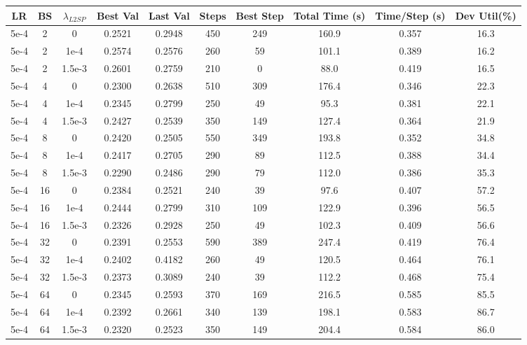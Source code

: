 \begin{table}[p]
\centering
\scriptsize
\renewcommand{\arraystretch}{0.9}

\begin{adjustbox}{max width=\textwidth,max totalheight=\textheight}
\begin{tabular}{cccccccccc}
\hline
LR & BS & $\lambda_{L2SP}$ & Best Val & Last Val & Steps & Best Step & Total Time (s) & Time/Step (s) & Dev Util(\%)\\
\hline
5e-4 &2&0      &0.2521&0.2948&450&249&160.9&0.357&16.3\\
5e-4 &2&1e-4   &0.2574&0.2576&260&59 &101.1&0.389&16.2\\
5e-4 &2&1.5e-3 &0.2601&0.2759&210&0  &88.0 &0.419&16.5\\
5e-4 &4&0      &0.2300&0.2638&510&309&176.4&0.346&22.3\\
5e-4 &4&1e-4   &0.2345&0.2799&250&49 &95.3 &0.381&22.1\\
5e-4 &4&1.5e-3 &0.2427&0.2539&350&149&127.4&0.364&21.9\\
5e-4 &8&0      &0.2420&0.2505&550&349&193.8&0.352&34.8\\
5e-4 &8&1e-4   &0.2417&0.2705&290&89 &112.5&0.388&34.4\\
5e-4 &8&1.5e-3 &0.2290&0.2486&290&79 &112.0&0.386&35.3\\
5e-4 &16&0     &0.2384&0.2521&240&39 &97.6 &0.407&57.2\\
5e-4 &16&1e-4  &0.2444&0.2799&310&109&122.9&0.396&56.5\\
5e-4 &16&1.5e-3&0.2326&0.2928&250&49 &102.3&0.409&56.6\\
5e-4 &32&0     &0.2391&0.2553&590&389&247.4&0.419&76.4\\
5e-4 &32&1e-4  &0.2402&0.4182&260&49 &120.5&0.464&76.1\\
5e-4 &32&1.5e-3&0.2373&0.3089&240&39 &112.2&0.468&75.4\\
5e-4 &64&0     &0.2345&0.2593&370&169&216.5&0.585&85.5\\
5e-4 &64&1e-4  &0.2392&0.2661&340&139&198.1&0.583&86.7\\
5e-4 &64&1.5e-3&0.2320&0.2523&350&149&204.4&0.584&86.0\\


\end{tabular}
\end{adjustbox}
\end{table}
